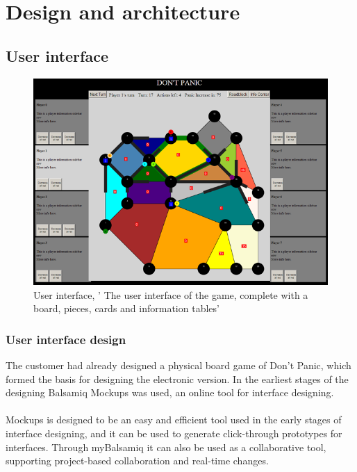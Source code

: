 \chapter{Design and architecture}

\section{User interface}

\begin{figure}[H]
  \centering
    \includegraphics[width=1.0\textwidth]{img/earlyVersion.png}
  \caption{User interface, ' The user interface of the game, complete with a board, pieces, cards and information tables'} 
  \label{fig:earlyversion}
\end{figure}









\subsection{User interface design}

The customer had already designed a physical board game of Don’t Panic, which formed the basis for designing the electronic version. In the earliest stages of the designing Balsamiq Mockups was used, an online tool for interface designing.\\
\\
Mockups is designed to be an easy and efficient tool used in the early stages of interface designing, and it can be used to generate click-through prototypes for interfaces. Through myBalsamiq it can also be used as a collaborative tool, supporting project-based collaboration and real-time changes.\\

